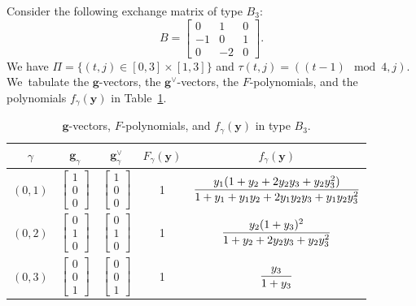 \documentclass[10pt,a4paper]{amsart}
\def\y{{\mathbf y}}
\def\g{{\mathbf g}}
\numberwithin{equation}{section}
\begin{document}
\begin{Example}\label{ex:B3}
Consider the following exchange matrix of type $B_3$:
\[
B=\begin{bmatrix} 0&1&0 \\ -1&0&1 \\ 0&-2&0 \end{bmatrix}\!.
\]
We have $\Pi = \{(t,j) \in [0,3] \times [1,3]\}$ and $\tau(t,j) = ((t-1) \mod 4,j)$. We~tabulate the $\g$-vectors, the $\g^\vee$-vectors, the $F$-polynomials, and the polynomials $f_\gamma(\y)$ in Table~\ref{fig:B3}.
\begin{table}[t!]
\setlength{\tabcolsep}{2.0pt}
\renewcommand{\arraystretch}{1.2}
\caption{$\g$-vectors, $F$-polynomials, and $f_\gamma(\y)$ in type $B_3$.}
\label{fig:B3}
\begin{tabular}{c|c|c|c|c}
\hline
$\gamma$ & $\g_\gamma$ & $\g^\vee_\gamma$ & $F_\gamma(\y)$ & $f_\gamma(\y)$\\
\hline
$(0,1)$ & $\begin{bmatrix}1\\[-1ex]0\\[-1ex]0 \end{bmatrix}$& $\begin{bmatrix}1\\[-1ex]0\\[-1ex]0 \end{bmatrix}$& 1& $\dfrac{ y_1(1 + y_2 + 2y_2y_3 + y_2y_3^2)}{1 + y_1 + y_1y_2 + 2y_1y_2y_3 + y_1y_2y_3^2}\vphantom{\begin{bmatrix}1\\[-.5ex]0\\[-.5ex]0 \end{bmatrix}}$\\
\hline
$(0,2)$ & $\begin{bmatrix}0\\[-1ex]1\\[-1ex]0 \end{bmatrix}$ & $\begin{bmatrix}0\\[-1ex]1\\[-1ex]0 \end{bmatrix}$ & 1& $\dfrac{y_2(1+y_3)^2}{1 + y_2 + 2y_2y_3 + y_2y_3^2}\vphantom{\begin{bmatrix}1\\[-.5ex]0\\[-.5ex]0 \end{bmatrix}}$\\
\hline
$(0,3)$ & $\begin{bmatrix}0\\[-1ex]0\\[-1ex]1 \end{bmatrix}$ & $\begin{bmatrix}0\\[-1ex]0\\[-1ex]1 \end{bmatrix}$ & 1 & $\dfrac{y_3}{1+y_3}\vphantom{\begin{bmatrix}1\\[-.5ex]0\\[-.5ex]0 \end{bmatrix}}$\\

\end{tabular}
\end{table}
\end{Example}
\end{document}
